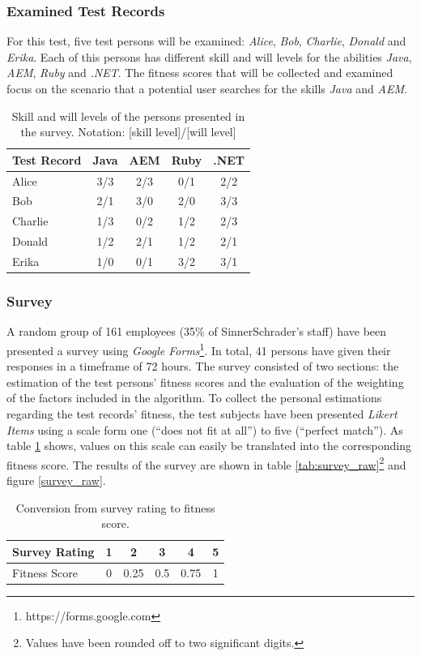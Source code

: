 \subsubsection{Examined Test Records}
For this test, five test persons will be examined: \textit{Alice}, \textit{Bob}, \textit{Charlie}, \textit{Donald} and \textit{Erika}. Each of this persons has different skill and will levels for the abilities \textit{Java}, \textit{AEM}, \textit{Ruby} and \textit{.NET}. The fitness scores that will be collected and examined focus on the scenario that a potential user searches for the skills \textit{Java} and \textit{AEM}.
\begin{table}[H]
\centering
  \begin{tabular}{l||c|c|c|c}
		Test Record  & Java & AEM & Ruby & .NET\\
		\hline
		Alice   & 3/3   & 2/3  & 0/1   & 2/2 \\
		Bob     & 2/1   & 3/0  & 2/0   & 3/3 \\
		Charlie & 1/3   & 0/2  & 1/2   & 2/3 \\
		Donald  & 1/2   & 2/1  & 1/2   & 2/1 \\
		Erika   & 1/0   & 0/1  & 3/2   & 3/1 \\
  \end{tabular}
\caption[Survey: Test Record Overview]{Skill and will levels of the persons presented in the survey. Notation: [skill level]/[will level]}
\end{table}
\subsubsection{Survey}
A random group of 161 employees (35\% of SinnerSchrader's staff) have been presented a survey using \textit{Google Forms}\footnote{https://forms.google.com}.
In total, 41 persons have given their responses in a timeframe of 72 hours.
The survey consisted of two sections: the estimation of the test persons' fitness scores and the evaluation of the weighting of the factors included in the algorithm. To collect the personal estimations regarding the test records' fitness, the test subjects have been presented \textit{Likert Items} using a scale form one (``does not fit at all'') to five (``perfect match''). As table \ref{tab:scoretrans} shows, values on this scale can easily be translated into the corresponding fitness score. The results of the survey are shown in table \ref{tab:survey_raw}\footnote{Values have been rounded off to two significant digits.} and figure \ref{survey_raw}.
\begin{table}[H]
\centering
\begin{tabular}{l||c|c|c|c|c}
	Survey Rating & 1 & 2    & 3   & 4    & 5\\
	\hline
	Fitness Score & 0 & 0.25 & 0.5 & 0.75 & 1\\
\end{tabular}
\caption[Survey: Rating to Fitness Score]{Conversion from survey rating to fitness score.}
\label{tab:scoretrans}
\end{table}

